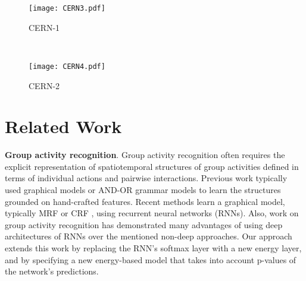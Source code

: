 \documentclass[10pt,twocolumn,letterpaper]{article}
\begin{document}
    \begin{figure*}
      \centering
      \begin{subfigure}{0.40\linewidth}
      \centering
      \texttt{[image: CERN3.pdf]}
      \caption{CERN-1}
      \label{fig:CERN-1}
      \end{subfigure}
      ~
      \begin{subfigure}{0.55\linewidth}
      \centering
      \texttt{[image: CERN4.pdf]}
      \caption{CERN-2}
       \label{fig:CERN-2}
      \end{subfigure}
      \caption{We specify and evaluate two versions of CERN. CERN is a deep architecture of LSTMs, which are grounded via CNNs to video frames at the bottom. The LSTMs forward their class predictions to the energy layer (EL) at the top. CERN-1 has LSTMs only at the bottom level which compute distributions of individual action classes (colored boxes) or distributions of interaction classes (colored links between green boxes). CERN-2 has an additional LSTM for computing the distribution of event (or group activity) classes. The EL takes the LSTM outputs, and infers an energy minimum with the maximum confidence. The figure shows that CERN-1 and CERN-2 give different results for the group activity \textit{crossing}. CERN-1 wrongly predicts \textit{walking}. CERN-2 typically yields better results for group activities that can not be defined only by individual actions.}
       \label{fig:architecture}
   \end{figure*}
   


\section{Related Work}\label{sec:prior_work}

{\bf Group activity recognition}. Group activity recognition often requires the explicit representation of spatiotemporal structures of group activities defined in terms of individual actions and pairwise interactions. Previous work typically used graphical models \cite{Lan2012PAMI,Lan2012,Ramananthan2013,Amer2014,Choi2014} or AND-OR grammar models \cite{Amer2012,Shu2015} to learn the structures grounded on hand-crafted features. Recent methods learn a graphical model, typically MRF \cite{Chen2015,Wu2016} or CRF \cite{Zhang2015,Jain2016,Liang2016}, using recurrent neural networks (RNNs). Also, work on group activity recognition \cite{Ibrahim2016,Deng2016} has demonstrated many advantages of using deep architectures of RNNs over the mentioned non-deep approaches.  Our approach extends this work by replacing the RNN's softmax layer with a new energy layer, and by specifying a new energy-based model that takes into account p-values of the network's predictions.
\end{document}
